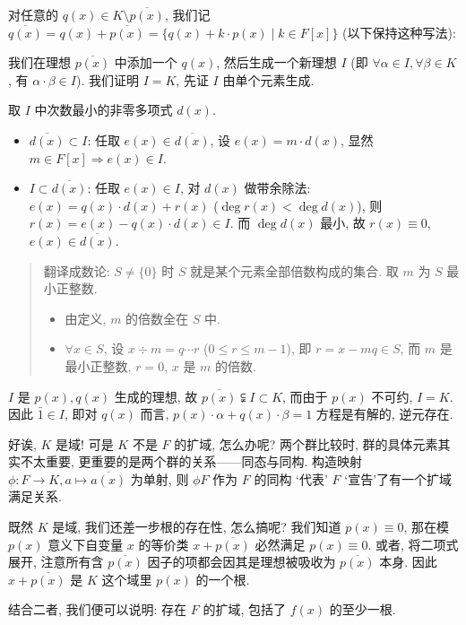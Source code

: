 \documentclass[UTF8,a4paper,12pt]{ctexart}
\begin{document}
对任意的 $q(x)\in K \setminus \overline{p(x)}$, 我们记 $\overline{q(x)}=q(x)+\overline{p(x)}=\{q(x)+k\cdot p(x)\mid k\in F[x]\}$ (以下保持这种写法):

我们在理想 $\overline{p(x)}$ 中添加一个 $q(x)$, 然后生成一个新理想 $I$ (即 $\forall\alpha\in I, \forall\beta\in K$, 有 $\alpha\cdot\beta\in I$). 我们证明 $I=K$, 先证 $I$ 由单个元素生成.

取 $I$ 中次数最小的非零多项式 $d(x)$.
\begin{itemize}
  \item[1)] $\overline{d(x)}\subset I$: 任取 $e(x)\in\overline{d(x)}$, 设 $e(x)=m\cdot d(x)$, 显然 $m\in F[x] \Rightarrow e(x)\in I$.
  \item[2)] $I\subset\overline{d(x)}$: 任取 $e(x)\in I$, 对 $d(x)$ 做带余除法: $e(x)=q(x)\cdot d(x)+r(x)$ ($\deg r(x)<\deg d(x)$), 则 $r(x)=e(x)-q(x)\cdot d(x)\in I$. 而 $\deg d(x)$ 最小, 故 $r(x)\equiv 0$, $e(x)\in\overline{d(x)}$.
\end{itemize}

\begin{quote}
  翻译成数论: $S\neq\{0\}$ 时 $S$ 就是某个元素全部倍数构成的集合. 取 $m$ 为 $S$ 最小正整数.
  \begin{itemize}
    \item[1)] 由定义, $m$ 的倍数全在 $S$ 中.
    \item[2)] $\forall x\in S$, 设 $x\div m=q\cdots r$ ($0\leq r\leq m-1$), 即 $r=x-mq\in S$, 而 $m$ 是最小正整数, $r=0$, $x$ 是 $m$ 的倍数.
  \end{itemize}
\end{quote}

$I$ 是 $p(x), q(x)$ 生成的理想, 故 $\overline{p(x)}\subsetneqq I\subset K$, 而由于 $p(x)$ 不可约, $I=K$. 因此 $\bar{1}\in I$, 即对 $q(x)$ 而言, $p(x)\cdot\alpha+q(x)\cdot\beta=1$ 方程是有解的, 逆元存在.

好诶, $K$ 是域! 可是 $K$ 不是 $F$ 的扩域, 怎么办呢? 两个群比较时, 群的具体元素其实不太重要, 更重要的是两个群的关系——同态与同构. 构造映射 $\phi:F\rightarrow K, a\mapsto \overline{a(x)}$ 为单射, 则 $\phi{F}$ 作为 $F$ 的同构 `代表' $F$ `宣告'了有一个扩域满足关系. 

既然 $K$ 是域, 我们还差一步根的存在性, 怎么搞呢? 我们知道 $p(x)\equiv 0$, 那在模 $p(x)$ 意义下自变量 $x$ 的等价类 $x+\overline{p(x)}$ 必然满足 $p(x)\equiv 0$. 或者, 将二项式展开, 注意所有含 $\overline{p(x)}$ 因子的项都会因其是理想被吸收为 $\overline{p(x)}$ 本身. 因此 $x+\overline{p(x)}$ 是 $K$ 这个域里 $p(x)$ 的一个根.

结合二者, 我们便可以说明: 存在 $F$ 的扩域, 包括了 $f(x)$ 的至少一根.
\end{document}

